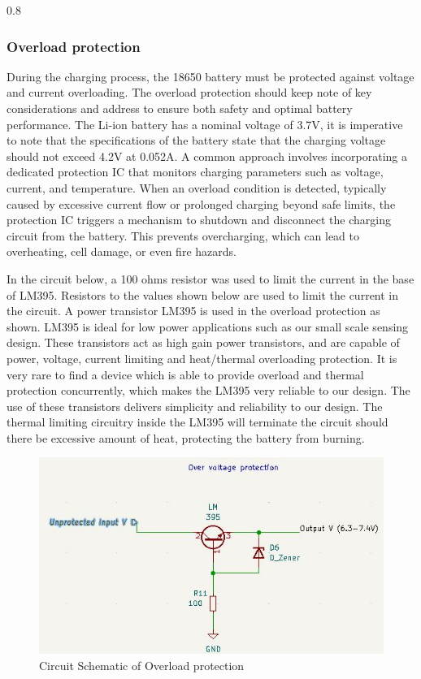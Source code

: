 \documentclass[class=report,11pt,crop=false]{standalone}
\begin{document}
\begin{table}[h!]
\begin{tabularx}{0.8\textwidth}
{{	\subsubsection{Overload protection}
	\vspace{0.5cm}
	During the charging process, the 18650 battery must be protected against voltage and current overloading. The overload protection should keep note of key considerations and address to ensure both safety and optimal battery performance. The Li-ion battery has a nominal voltage of 3.7V, it is imperative to note that the specifications of the battery state that the charging voltage should not exceed 4.2V at 0.052A. A common approach involves incorporating a dedicated protection IC that monitors charging parameters such as voltage, current, and temperature. When an overload condition is detected, typically caused by excessive current flow or prolonged charging beyond safe limits, the protection IC triggers a mechanism to shutdown and disconnect the charging circuit from the battery. This prevents overcharging, which can lead to overheating, cell damage, or even fire hazards.
	
	In the circuit below, a 100 ohms resistor was used to limit the current in the base of LM395. Resistors to the values shown below are used to limit the current in the circuit. A power transistor LM395 is used in the overload protection as shown. LM395 is ideal for low power applications such as our small scale sensing design. These transistors act as high gain power transistors, and are capable of power, voltage, current limiting and heat/thermal overloading protection. It is very rare to find a device which is able to provide overload and thermal protection concurrently, which makes the LM395 very reliable to our design. The use of these transistors delivers simplicity and reliability to our design. The thermal limiting circuitry inside the LM395 will terminate the circuit should there be excessive amount of heat, protecting the battery from burning. 
	
	\begin{figure}[h!]
		\centering
		\includegraphics[width=0.9\linewidth]{Figures/Overload protection.jpg}
		\caption{Circuit Schematic of Overload protection}
		\label{fig:P3}
	\end{figure}
	
}}
\end{tabularx}
\end{table}
\end{document}
